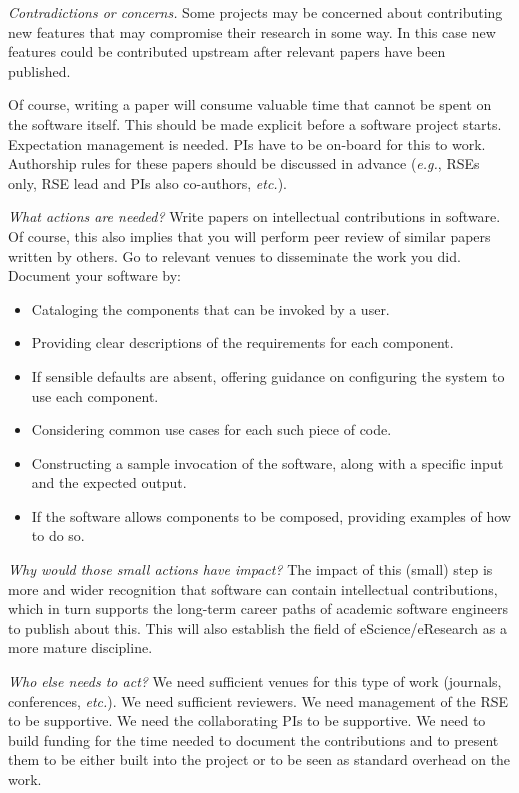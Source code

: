 \documentclass[a4paper,UKenglish]{dagman}
\newcommand{\eg}{\emph{e.g.},\xspace}
\newcommand{\etc}{\emph{etc.}\xspace}
\begin{document}
\emph{Contradictions or concerns.}
Some projects may be concerned about contributing new features that may compromise their research in some way. In this case new features could be contributed upstream after relevant papers have been published.

Of course, writing a paper will consume valuable time that cannot be spent on the software itself. This should be made explicit before a software project starts. Expectation management is needed. PIs have to be on-board for this to work. Authorship rules for these papers should be discussed in advance (\eg RSEs only, RSE lead and PIs also co-authors, \etc).

\emph{What actions are needed?}
Write papers on intellectual contributions in software. Of course, this also implies that you will perform peer review of similar papers written by others. Go to relevant venues to disseminate the work you did.
Document your software by:
\begin{itemize}
\item Cataloging the components that can be invoked by a user.
\item Providing clear descriptions of the requirements for each component.
\item If sensible defaults are absent, offering guidance on configuring the system to use each component.
\item Considering common use cases for each such piece of code.
\item Constructing a sample invocation of the software, along with a specific input and the expected output.
\item If the software allows components to be composed, providing examples of how to do so.
\end{itemize}


\emph{Why would those small actions have impact?}
The impact of this (small) step is more and wider recognition that software can contain intellectual contributions, which in turn supports the long-term career paths of academic software engineers to publish about this. This will also establish the field of eScience/eResearch as a more mature discipline.

\emph{Who else needs to act?}
We need sufficient venues for this type of work (journals, conferences, \etc).  We need sufficient reviewers.  We need management of the RSE to be supportive.  We need the collaborating PIs to be supportive.  We need to build funding for the time needed to document the contributions and to present them to be either built into the project or to be seen as standard overhead on the work.
\end{document}
